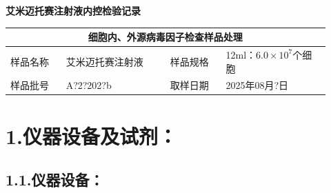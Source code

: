 \documentclass[UTF8,10pt,a4paper,fontset=fandol]{ctexart}
\newcommand{\fieldvalue}[1]{#1}
\newcommand{\handwritten}[1]{#1}
\begin{document}
\newpage

\begin{center}
\textbf{艾米迈托赛注射液内控检验记录}
\end{center}

\begin{center}
\begin{tabular}{|p{0.16\linewidth}|p{0.30\linewidth}|p{0.16\linewidth}|p{0.30\linewidth}|}
\hline
\multicolumn{4}{|c|}{细胞内、外源病毒因子检查样品处理}\\
\hline
样品名称 &
\fieldvalue{艾米迈托赛注射液} &
样品规格 &
\fieldvalue{12ml：$6.0\times10^{7}$个细胞}\\
\hline
样品批号 &
\fieldvalue{\handwritten{A?2?202?b}} &
取样日期 &
\fieldvalue{\handwritten{2025年08月?日}}\\
\hline
\end{tabular}
\end{center}

\section*{1.\quad 仪器设备及试剂：}

\subsection*{1.1.\quad 仪器设备：}
\end{document}
